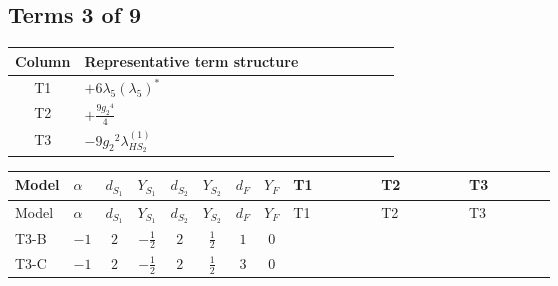 \documentclass[8pt]{article}
\begin{document}
\begin{landscape}
\subsection*{Terms 3 of 9}
\begin{center}
\begin{tabular}{@{}c >{\raggedright\arraybackslash}p{0.82\linewidth}@{}}
\toprule
Column & Representative term structure \\
\midrule
T1 & \(\displaystyle +6 {\lambda_5} \left({\lambda_5}\right)^{*}\) \\
\midrule
T2 & \(\displaystyle +\frac{9 {g_2}^4}{4}\) \\
\midrule
T3 & \(\displaystyle -9 {g_2}^2 {\lambda_{HS_2}^{(1)}}\) \\
\midrule
\bottomrule
\end{tabular}
\end{center}
\smallskip
\tiny
\begin{longtable}{@{}llcccccc >{\raggedright\arraybackslash}p{0.21\linewidth} >{\raggedright\arraybackslash}p{0.21\linewidth} >{\raggedright\arraybackslash}p{0.21\linewidth}@{}}
\toprule
Model & $\alpha$ & $d_{S_1}$ & $Y_{S_1}$ & $d_{S_2}$ & $Y_{S_2}$ & $d_F$ & $Y_F$ & T1 & T2 & T3 \\
\midrule
\endfirsthead
\toprule
Model & $\alpha$ & $d_{S_1}$ & $Y_{S_1}$ & $d_{S_2}$ & $Y_{S_2}$ & $d_F$ & $Y_F$ & T1 & T2 & T3 \\
\midrule
\endhead
T3-B & $-1$ & $2$ & $-\frac{1}{2}$ & $2$ & $\frac{1}{2}$ & $1$ & $0$ & \scriptsize\adjustbox{max width=\linewidth}{$\begin{gathered} +6 {\lambda_5} \left({\lambda_5}\right)^{*}\end{gathered}$} & \scriptsize\adjustbox{max width=\linewidth}{$\begin{gathered} +\frac{9 {g_2}^4}{4}\end{gathered}$} & \scriptsize\adjustbox{max width=\linewidth}{$\begin{gathered} -9 {g_2}^2 {\lambda_{HS_2}^{(1)}}\end{gathered}$} \\
\midrule
T3-C & $-1$ & $2$ & $-\frac{1}{2}$ & $2$ & $\frac{1}{2}$ & $3$ & $0$ & \scriptsize\adjustbox{max width=\linewidth}{$\begin{gathered} +6 {\lambda_5} \left({\lambda_5}\right)^{*}\end{gathered}$} & \scriptsize\adjustbox{max width=\linewidth}{$\begin{gathered} +\frac{9 {g_2}^4}{4}\end{gathered}$} & \scriptsize\adjustbox{max width=\linewidth}{$\begin{gathered} -9 {g_2}^2 {\lambda_{HS_2}^{(1)}}\end{gathered}$} \\

\end{longtable}
\end{landscape}
\end{document}
